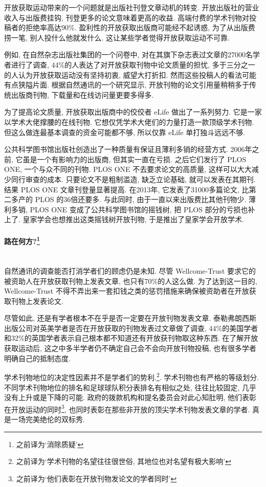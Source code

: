 \documentclass[a4paper, 12pt, UTF8]{article}
\begin{document}
开放获取运动带来的一个问题就是出版社刊登文章动机的转变. 开放出版社的营业收入与出版费挂钩, 刊登更多的论文意味着更高的收益. 高端付费的学术刊物对投稿者的拒绝率高达90\%. 盈利性的开放获取出版商可能经不起诱惑, 为了从出版费捞一笔, 别人投什么他就发什么. 这让某些学者觉得开放获取运动不可靠.

例如, 在自然杂志出版社集团的一个问卷中, 对在其旗下杂志表过文章的27000名学者进行了调查, 44\%的人表达了对开放获取刊物中论文质量的担忧, 多于三分之一的人认为开放获取运动没有坚持初衷, 威望大打折扣. 然而这些投稿人的看法可能有点狭隘片面. 根据自然通讯的一个研究显示, 开放刊物的论文引用量稍稍多于传统出版商刊物, 下载量和在线访问量更要多得多.

为了提高论文质量, 开放获取出版商中的佼佼者 eLife 做出了一系列努力. 它是一家以学术大佬撑腰的在线刊物. 它想仅凭学术大佬们的力量打造一款顶级学术刊物. 但这么做连最基本调查的资金可能都不够, 所以仅靠 eLife 单打独斗远远不够.

公共科学图书馆出版社创造出了一种质量有保证且薄利多销的经营方式. 2006年之前, 它虽是一个有影响力的出版商, 但其实一直在亏损. 之后它们发行了 PLOS ONE, 一个与众不同的刊物. PLOS ONE 不去要求论文的高质量, 这样可以大大减少同行审查的成本. 只要论文不是粗制滥造, 缺乏立论基础, 就可以发表在其期刊.  结果 PLOS ONE 文章刊登量显著提高. 在2013年, 它发表了31000多篇论文, 比第二多产的 PLOS 的36倍还要多. 与此同时, 由于一直以来出版费比其他刊物少. 薄利多销, PLOS ONE 变成了公共科学图书馆的摇钱树, 把 PLOS 部分的亏损也补上了. 皇家学会也想推出这类摇钱树开放刊物, 于是推出了皇家学会开放学术.

\paragraph*{\large 路在何方?\footnote[2]{之前译为`消除质疑'}} \hspace{10pt} \\

自然通讯的调查能否打消学者们的顾虑仍是未知. 尽管 Wellcome-Trust 要求它的被资助人在开放获取刊物上发表文章, 也只有70\%的人这么做. 为了达到这一目的, Wellcome-Trust 不得不弄出来一套扣钱之类的惩罚措施来确保被资助者在开放获取刊物上发表论文.

尽管如此, 还是有学者根本不在乎是否一定要在开放刊物发表文章. 泰勒弗朗西斯出版公司对英美学者是否在开放获取的刊物发表过文章做了调查, 44\%的美国学者和32\%的英国学者表示自己根本都不知道还有开放获刊物取这种东西. 在了解开放获取运动后, 这之中多半学者仍不确定自己会不会向开放刊物投稿, 也有很多学者明确自己的抵制态度.

学术刊物地位的决定性因素并不是学者们的势利.\footnote[3]{之前译为`学术刊物的名望往往很世俗, 其地位也对名望有极大影响'}. 学术刊物也有严格的等级划分. 不同学术刊物地位的排名和足球球队积分表排名有相似之处, 往往比较固定, 几乎没有上升或是下降的可能. 政府的拨款机构和提名委员会对此心知肚明, 他们表彰在开放运动的同时\footnote[4]{之前译为`他们表彰在开放刊物发论文的学者同时'}, 也同时表彰在那些非开放的顶尖学术刊物发表文章的学者. 真是一场完美绝伦的双标秀.
\end{document}
